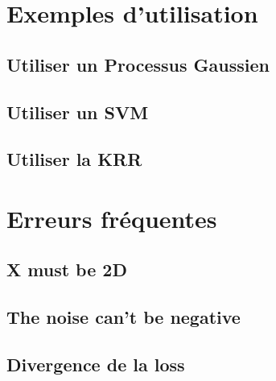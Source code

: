 \documentclass[12pt,a4paper]{report}
\begin{document}
\chapter{Exemples d'utilisation}
\section{Utiliser un Processus Gaussien}
\section{Utiliser un SVM}
\section{Utiliser la KRR}

\chapter{Erreurs fréquentes}
\section{X must be 2D}
\section{The noise can't be negative}
\section{Divergence de la loss}
\end{document}
